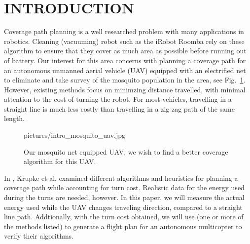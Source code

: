 \section{INTRODUCTION}

Coverage path planning is a well researched problem with many applications in robotics.
Cleaning (vacuuming) robot such as the iRobot Roomba rely on these algorithm to ensure that they cover as much area as possible before running out of battery.
Our interest for this area concerns with planning a coverage path for an autonomous unmanned aerial vehicle (UAV) equipped with an electrified net to eliminate and take survey of the mosquito population in the area, see Fig.~\ref{fig:mosuav}.
However, existing methods focus on minimzing distance travelled, with minimal attention to the cost of turning the robot.
For most vehicles, travelling in a straight line is much less costly than travelling in a zig zag path of the same length.

\begin{figure}
	\centering
	\begin{overpic}[width=0.9\columnwidth]{pictures/intro_mosquito_uav.jpg}
	\end{overpic}
	\caption{\label{fig:mosuav}
		Our mosquito net equipped UAV, we wish to find a better coverage algorithm for this UAV.
	}
\end{figure}

In \cite{krupkethesis}, Krupke et al. examined different algorithms and heuristics for planning a coverage path while accounting for turn cost.
Realistic data for the energy used during the turns are needed, however. 
In this paper, we will measure the actual energy used while the UAV changes traveling direction, compared to a straight line path.
Addtionally, with the turn cost obtained, we will use (one or more of the methods listed) to generate a flight plan for an autonomous multicopter to verify their algorithms.

